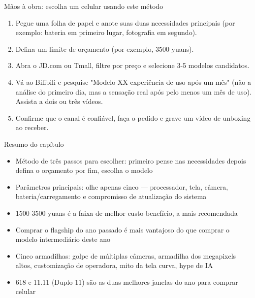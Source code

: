 \begin{tcbpractice}{Mãos à obra: escolha um celular usando este método}
\begin{enumerate}
  \item Pegue uma folha de papel e anote suas duas necessidades principais (por exemplo: bateria em primeiro lugar, fotografia em segundo).
  \item Defina um limite de orçamento (por exemplo, 3500 yuans).
  \item Abra o JD.com ou Tmall, filtre por preço e selecione 3-5 modelos candidatos.
  \item Vá ao Bilibili e pesquise "Modelo XX experiência de uso após um mês" (não a análise do primeiro dia, mas a sensação real após pelo menos um mês de uso). Assista a dois ou três vídeos.
  \item Confirme que o canal é confiável, faça o pedido e grave um vídeo de unboxing ao receber.
\end{enumerate}

\end{tcbpractice}

\begin{tcbsummary}{Resumo do capítulo}
\begin{itemize}
  \item Método de três passos para escolher: primeiro pense nas necessidades depois defina o orçamento por fim, escolha o modelo
  \item Parâmetros principais: olhe apenas cinco — processador, tela, câmera, bateria/carregamento e compromisso de atualização do sistema
  \item 1500-3500 yuans é a faixa de melhor custo-benefício, a mais recomendada
  \item Comprar o flagship do ano passado é mais vantajoso do que comprar o modelo intermediário deste ano
  \item Cinco armadilhas: golpe de múltiplas câmeras, armadilha dos megapixels altos, customização de operadora, mito da tela curva, hype de IA
  \item 618 e 11.11 (Duplo 11) são as duas melhores janelas do ano para comprar celular
\end{itemize}

\end{tcbsummary}
